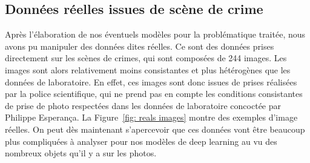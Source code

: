\documentclass[a4paper]{article}
\begin{document}
\subsection{Données réelles issues de scène de crime}
Après l'élaboration de nos éventuels modèles pour la problématique traitée, nous avons pu manipuler des données dites réelles. Ce sont des données prises directement sur les scènes de crimes, qui sont composées de 244 images. Les images sont alors relativement moins consistantes et plus hétérogènes que les données de laboratoire. En effet, ces images sont donc issues de prises réalisées par la police scientifique, qui ne prend pas en compte les conditions consistantes de prise de photo respectées dans les données de laboratoire concoctée par Philippe Esperança. La Figure~\ref{fig: reals images} montre des exemples d'image réelles. On peut dès maintenant s'apercevoir que ces données vont être beaucoup plus compliquées à analyser pour nos modèles de deep learning au vu des nombreux objets qu'il y a sur les photos.
\end{document}
